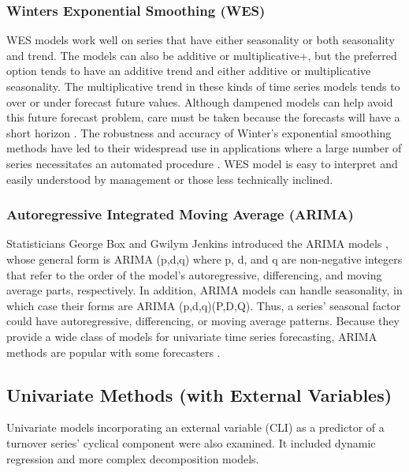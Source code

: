 \subsubsection{Winters Exponential Smoothing (WES)}
WES models work well on series that have either seasonality or both seasonality and trend.  The models can also be additive or multiplicative+, but the preferred option tends to have an additive trend and either additive or multiplicative seasonality.  The multiplicative trend in these kinds of time series models tends to over or under forecast future values. Although dampened models can help avoid this future forecast problem, care must be taken because the forecasts will have a short horizon \citep{de1998}. The robustness and accuracy of Winter's exponential smoothing methods have led to their widespread use in applications where a large number of series necessitates an automated procedure \citep{win1960,tay2003}. WES model is easy to interpret and easily understood by management or those less technically inclined. 
\subsubsection{Autoregressive Integrated Moving Average (ARIMA)}
Statisticians George Box and Gwilym Jenkins introduced the ARIMA models \citep{box1970}, whose general form is ARIMA (p,d,q) where p, d, and q are non-negative integers that refer to the order of the model's autoregressive, differencing, and moving average parts,  respectively. In addition, ARIMA models can handle seasonality, in which case their forms are ARIMA (p,d,q)(P,D,Q). Thus, a series' seasonal factor could have autoregressive, differencing, or moving average patterns.  Because they provide a wide class of models for univariate time series forecasting, ARIMA methods are popular with some forecasters \citep{har1983}.  

\subsection{Univariate Methods (with External Variables)}
Univariate models incorporating an external variable (CLI) as a predictor of a turnover series' cyclical component were also examined. It included dynamic regression and more complex decomposition models.
